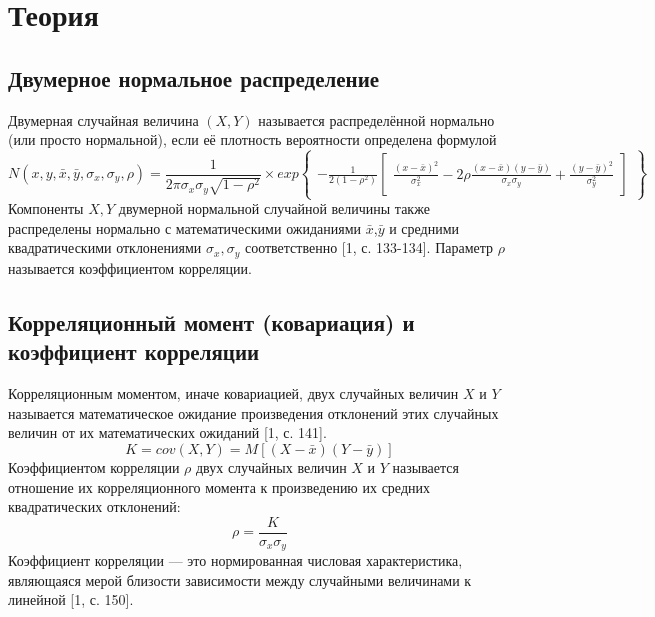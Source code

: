 \documentclass[a4paper]{article}
\begin{document}
\section{Теория}
    \subsection{Двумерное нормальное распределение}
            \noindent Двумерная случайная величина $(X,Y)$ называется распределённой нормально (или просто нормальной), если её плотность вероятности определена формулой
            \begin{equation}
                N(x, y, \bar{x}, \bar{y}, \sigma_{x}, \sigma_{y}, \rho) =
                \frac{1}{2\pi\sigma_{x}\sigma_{y}\sqrt{1-\rho^{2}}} \times
                exp{\begin{Bmatrix}
                        -\frac{1}{2(1-\rho^{2})}
                        \begin{bmatrix}
                            \frac{(x-\bar{x})^{2}}{\sigma_{x}^{2}} - 2\rho\frac{(x-\bar{x})(y-\bar{y})}{\sigma_{x}\sigma_{y}} + \frac{(y-\bar{y})^{2}}{\sigma_{y}^{2}}
                        \end{bmatrix}
                    \end{Bmatrix}}
            \end{equation}
            Компоненты $X,Y$ двумерной нормальной случайной величины также распределены нормально с математическими ожиданиями $\bar{x}$,$\bar{y}$ и средними квадратическими отклонениями $\sigma_{x},\sigma_{y}$ соответственно [1, с. 133-134].
            Параметр $\rho$ называется коэффициентом корреляции.


        \subsection{Корреляционный момент (ковариация) и коэффициент корреляции}
            \noindent Корреляционным моментом, иначе ковариацией, двух случайных величин $X$ и $Y$ называется математическое ожидание произведения отклонений этих случайных величин от их математических ожиданий [1, с. 141].
            \begin{equation}
                K = cov(X, Y) = M[(X - \bar{x})(Y - \bar{y})]
                \label{K}
            \end{equation}
            Коэффициентом корреляции $\rho$ двух случайных величин $X$ и $Y$ называется отношение их корреляционного момента к произведению их средних квадратических отклонений:
            \begin{equation}
                \rho = \frac{K}{\sigma_{x}\sigma_{y}}
                \label{ro}
            \end{equation}
            Коэффициент корреляции — это нормированная числовая характеристика, являющаяся мерой близости зависимости между случайными величинами к линейной [1, с. 150].
\end{document}
